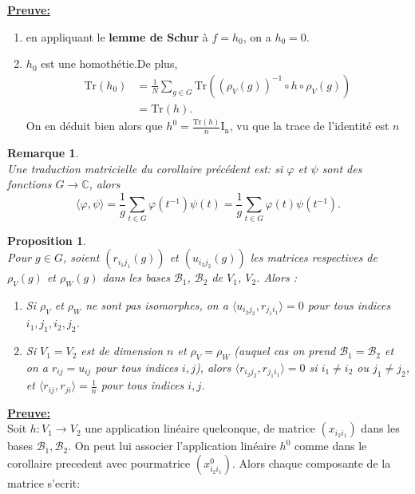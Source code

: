 \documentclass[a4paper, 14pt]{report}
\newtheorem{remark}{Remarque}[section]
\newtheorem{proposition}{Proposition}[section]
\begin{document}
\begin{onehalfspace}
{			
			\textbf{\underline{Preuve:}}\\
			\begin{enumerate}[label=\roman*)]
				\item en appliquant le \textbf{lemme de Schur} à \( f = h_0 \), on a \( h_0 = 0 \).
				\item \( h_0 \) est une homothétie.De plus, \[
				\begin{aligned}
					\text{Tr}(h_0) &= \frac{1}{N} \sum_{g \in G} \text{Tr}((\rho_V(g))^{-1} \circ h \circ \rho_V(g)) \\
					&= \text{Tr}(h).
				\end{aligned}
				\]
				On en déduit bien alors que \( h^0 = \frac{\text{Tr}(h)}{n} \mathrm{I_n} \), vu que la trace de l’identité est \( n \)
			\end{enumerate}
			
			\begin{remark} \cite{renard2009groupes}\\
				Une traduction matricielle du corollaire précédent est: 
				si \( \varphi \) et \( \psi \) sont des fonctions \( G \to \mathbb{C} \), alors
				\[
				\langle \varphi, \psi \rangle = \frac{1}{g} \sum_{t \in G} \varphi(t^{-1})\psi(t) 
				= \frac{1}{g} \sum_{t \in G} \varphi(t)\psi(t^{-1}). \tag{1}
				\]
			\end{remark}
			
			\begin{proposition} \cite{serre1971representation}\\
				Pour $g \in G$, soient $(r_{i_1 j_1}(g))$ et $(u_{i_2 j_2}(g))$ les matrices respectives de $\rho_V(g)$ et $\rho_W(g)$ dans les bases $\mathcal{B}_1$, $\mathcal{B}_2$ de $V_1$, $V_2$. Alors :
				\begin{enumerate}[label=\roman*)]
					\item Si $\rho_V$ et $\rho_W$ ne sont pas isomorphes, on a $\langle u_{i_2 j_2}, r_{j_1 i_1} \rangle = 0$ pour tous indices $i_1, j_1, i_2, j_2$.
					\item Si $V_1 = V_2$ est de dimension $n$ et $\rho_V = \rho_W$ (auquel cas on prend $\mathcal{B}_1 = \mathcal{B}_2$ et on a $r_{ij} = u_{ij}$ pour tous indices $i, j$), alors $\langle r_{i_2 j_2}, r_{j_1 i_1} \rangle = 0$ si $i_1 \neq i_2$ ou $j_1 \neq j_2$, et $\langle r_{ij}, r_{ji} \rangle = \frac{1}{n}$ pour tous indices $i, j$.
				\end{enumerate}
			\end{proposition}
			
			
			\textbf{\underline{Preuve:}}\\
			Soit $h : V_1 \to V_2$ une application linéaire quelconque, de matrice $(x_{i_2i_1})$ dans les bases $\mathcal{B}_1, \mathcal{B}_2$. On peut lui associer l'application linéaire $h^0$ comme dans le corollaire precedent avec pourmatrice $(x^0_{i_2i_1})$. Alors chaque composante de la matrice s'ecrit:
			
}
\end{onehalfspace}
\end{document}
